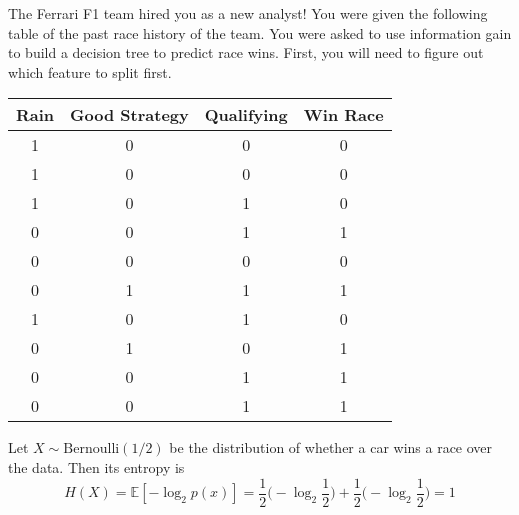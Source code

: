   \begin{example}
    The Ferrari F1 team hired you as a new analyst! You were given the following table of the past race history of the team. You were asked to use information gain to build a decision tree to predict race wins. First, you will need to figure out which feature to split first. 
    \begin{center}
      \begin{tabular}[c]{c|c|c||c}
      Rain & Good Strategy & Qualifying & Win Race \\ \hline
      1 & 0 & 0 & 0 \\
      1 & 0 & 0 & 0 \\
      1 & 0 & 1 & 0 \\
      0 & 0 & 1 & 1 \\
      0 & 0 & 0 & 0 \\
      0 & 1 & 1 & 1 \\
      1 & 0 & 1 & 0 \\
      0 & 1 & 0 & 1 \\
      0 & 0 & 1 & 1 \\
      0 & 0 & 1 & 1 \\
      \end{tabular}
    \end{center}

    Let $X \sim \mathrm{Bernoulli}(1/2)$ be the distribution of whether a car wins a race over the data. Then its entropy is 
    \begin{equation}
      H(X) = \mathbb{E}[-\log_2 p(x)] = \frac{1}{2} \big( -\log_2 \frac{1}{2} \big) + \frac{1}{2} \big( -\log_2 \frac{1}{2} \big) = 1
    \end{equation}


\end{example}
